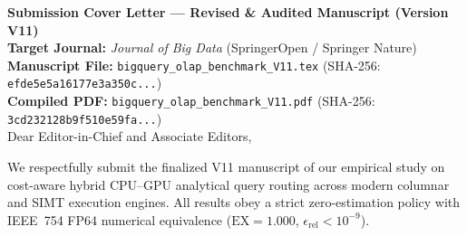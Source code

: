 \documentclass[11pt,a4paper]{article}
\begin{document}
\noindent\textbf{Submission Cover Letter --- Revised \& Audited Manuscript (Version V11)}\\[4pt]
\noindent\textbf{Target Journal:} \emph{Journal of Big Data} (SpringerOpen / Springer Nature)\\
\noindent\textbf{Manuscript File:} \texttt{bigquery\_olap\_benchmark\_V11.tex} (SHA-256: \texttt{efde5e5a16177e3a350c...})\\
\noindent\textbf{Compiled PDF:} \texttt{bigquery\_olap\_benchmark\_V11.pdf} (SHA-256: \texttt{3cd232128b9f510e59fa...})\\[8pt]
Dear Editor-in-Chief and Associate Editors,

We respectfully submit the finalized V11 manuscript of our empirical study on cost-aware hybrid CPU--GPU analytical query routing across modern columnar and SIMT execution engines. All results obey a strict zero-estimation policy with IEEE~754 FP64 numerical equivalence ($\text{EX}=1.000$, $\epsilon_{\text{rel}} < 10^{-9}$).
\end{document}
